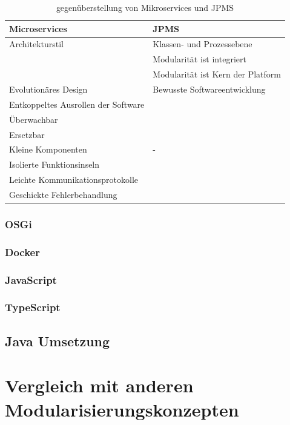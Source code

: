   \begin{table}[h!]
      \label{tab:jpms}
      \begin{tabular}{l|l}
        \textbf{Microservices} & \textbf{JPMS}\\
        \hline
        Architekturstil & Klassen- und Prozessebene \\
        & Modularität ist integriert \\
        & Modularität ist Kern der Platform \\
        \hline
        Evolutionäres Design  & Bewusste Softwareentwicklung \\
        Entkoppeltes Ausrollen der Software &\\
        Überwachbar &\\
        Ersetzbar &\\
        \hline
        Kleine Komponenten & - \\ 
        Isolierte Funktionsinseln &\\
        Leichte Kommunikationsprotokolle&\\
        Geschickte Fehlerbehandlung&\\

      \end{tabular}
      \caption{gegenüberstellung von Mikroservices und JPMS}
  \end{table}


\subsubsection{OSGi}


\subsubsection{Docker}
\subsubsection{JavaScript}
\subsubsection{TypeScript}
\subsection{Java Umsetzung} 
\newpage

\section{Vergleich mit anderen Modularisierungskonzepten}


